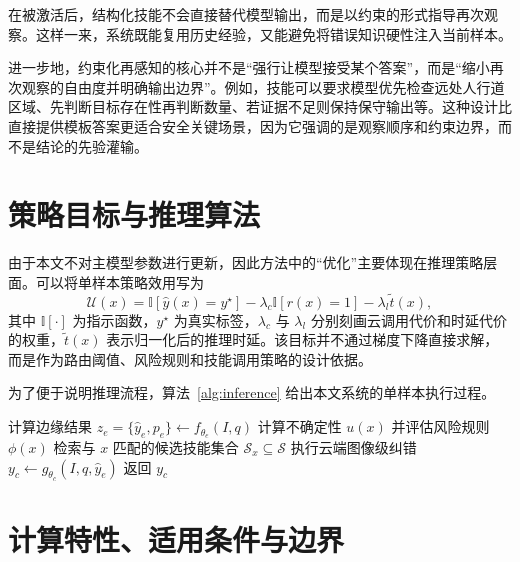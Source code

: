 在被激活后，结构化技能不会直接替代模型输出，而是以约束的形式指导再次观察。这样一来，系统既能复用历史经验，又能避免将错误知识硬性注入当前样本。

进一步地，约束化再感知的核心并不是“强行让模型接受某个答案”，而是“缩小再次观察的自由度并明确输出边界”。例如，技能可以要求模型优先检查远处人行道区域、先判断目标存在性再判断数量、若证据不足则保持保守输出等。这种设计比直接提供模板答案更适合安全关键场景，因为它强调的是观察顺序和约束边界，而不是结论的先验灌输。

\section{策略目标与推理算法}
\label{sec:method-objective}

由于本文不对主模型参数进行更新，因此方法中的“优化”主要体现在推理策略层面。可以将单样本策略效用写为
\begin{equation}
  \mathcal{U}(x)=\mathbb{I}[\hat{y}(x)=y^\star]-\lambda_c \mathbb{I}[r(x)=1]-\lambda_l \tilde{t}(x),
\end{equation}
其中 $\mathbb{I}[\cdot]$ 为指示函数，$y^\star$ 为真实标签，$\lambda_c$ 与 $\lambda_l$ 分别刻画云调用代价和时延代价的权重，$\tilde{t}(x)$ 表示归一化后的推理时延。该目标并不通过梯度下降直接求解，而是作为路由阈值、风险规则和技能调用策略的设计依据。

为了便于说明推理流程，算法~\ref{alg:inference} 给出本文系统的单样本执行过程。

\begin{algorithm}[htbp]
  \caption{免训练分层边缘云协同推理流程}
  \label{alg:inference}
  计算边缘结果 $z_e=\{\hat{y}_e,p_e\}\leftarrow f_{\theta_e}(I,q)$\;
  计算不确定性 $u(x)$ 并评估风险规则 $\phi(x)$\;
  检索与 $x$ 匹配的候选技能集合 $\mathcal{S}_x \subseteq \mathcal{S}$\;
  执行云端图像级纠错 $y_c\leftarrow g_{\theta_c}(I,q,\hat{y}_e)$\;
  返回 $y_c$\;
\end{algorithm}

\section{计算特性、适用条件与边界}
\label{sec:method-complexity}

